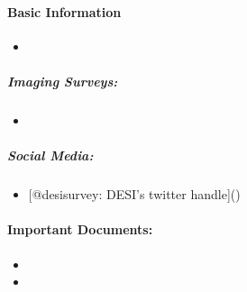 \documentclass[letterpaper,10pt,english]{sphinxmanual}
\begin{document}
\paragraph{Basic Information}
\label{\detokenize{resource/astro/projects/desi:basic-information}}\begin{itemize}
\item {} 

\end{itemize}


\subparagraph{Imaging Surveys:}
\label{\detokenize{resource/astro/projects/desi:imaging-surveys}}\begin{itemize}
\item {} 

\end{itemize}


\subparagraph{Social Media:}
\label{\detokenize{resource/astro/projects/desi:social-media}}\begin{itemize}
\item {} 
{[}@desisurvey: DESI’s twitter
handle{]}()

\end{itemize}


\paragraph{Important Documents:}
\label{\detokenize{resource/astro/projects/desi:important-documents}}\begin{itemize}
\item {} 

\item {} 

\end{itemize}
\end{document}
